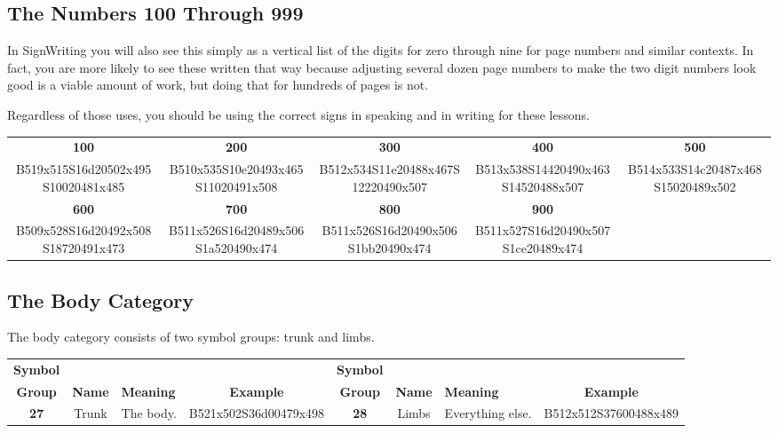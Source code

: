 \documentclass{article}
\begin{document}
\subsection{The Numbers 100 Through 999}

In SignWriting you will also see this simply as a vertical list of the digits for zero through nine for page numbers and similar contexts.
In fact, you are more likely to see these written that way because adjusting several dozen page numbers to make the two digit numbers look good is a viable amount of work, but doing that for hundreds of pages is not.

Regardless of those uses, you should be using the correct signs in speaking and in writing for these lessons.

\begin{center}
\begin{tabular}{*{5}{c}}
\textbf{100}&\textbf{200}&\textbf{300}&\textbf{400}&\textbf{500}\\
B519x515S16d20502x495S10020481x485&
B510x535S10e20493x465S11020491x508&
B512x534S11e20488x467S12220490x507&
B513x538S14420490x463S14520488x507&
B514x533S14c20487x468S15020489x502\\
\textbf{600}&\textbf{700}&\textbf{800}&\textbf{900}\\
B509x528S16d20492x508S18720491x473&
B511x526S16d20489x506S1a520490x474&
B511x526S16d20490x506S1bb20490x474&
B511x527S16d20490x507S1ce20489x474\\
\end{tabular}
\end{center}

\subsection{The Body Category}

The body category consists of two symbol groups: trunk and limbs.

\begin{center}
\begin{tabular}{ccp{21mm}c@{\hskip 5mm}ccp{21mm}c}
\textbf{Symbol}&&&&\textbf{Symbol}\\
\textbf{Group}&\textbf{Name}&\textbf{Meaning}&\textbf{Example}&\textbf{Group}&\textbf{Name}&\textbf{Meaning}&\textbf{Example}\\
\textbf{27}&Trunk&The body.&B521x502S36d00479x498&\textbf{28}&Limbs&Everything else.&B512x512S37600488x489\\
\end{tabular}
\end{center}
\end{document}
